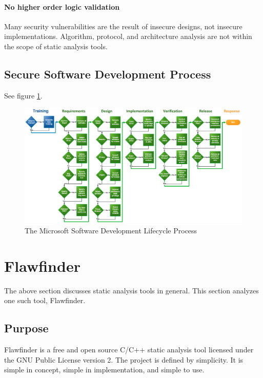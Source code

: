 \documentclass[journal]{IEEEtran}
\begin{document}
\paragraph{No higher order logic validation} Many security vulnerabilities are the result of
insecure designs, not insecure implementations. Algorithm, protocol, and architecture analysis are
not within the scope of static analysis tools.

\subsection{Secure Software Development Process}

See figure \ref{fig:ms_sdl}.

\onecolumn
\begin{landscape}
\begin{figure}
    \includegraphics[width=1.0\linewidth,height=1.0\textheight,keepaspectratio]{images/microsoft_sdl_process.png}
    \captionsetup{justification=centering}
    \caption{The Microsoft Software Development Lifecycle Process \cite{ms_sdl}}
    \label{fig:ms_sdl}
\end{figure}
\end{landscape}
\twocolumn


\section{Flawfinder}

The above section discusses static analysis tools in general. This section analyzes one such tool,
Flawfinder.

\subsection{Purpose}

Flawfinder is a free and open source C/C++ static analysis tool licensed under the GNU Public
License version 2. The project is defined by simplicity. It is simple in concept, simple in
implementation, and simple to use.
\end{document}
